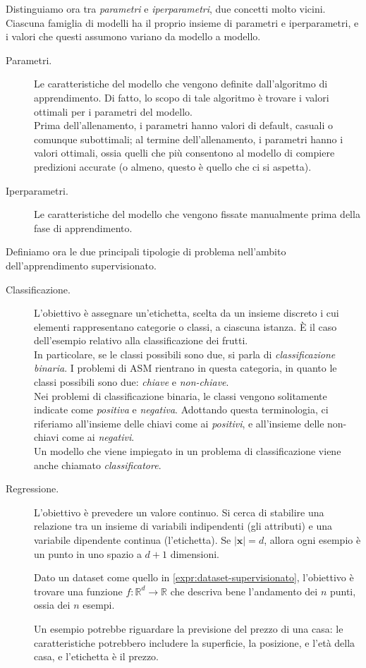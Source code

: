 \noindent Distinguiamo ora tra \textit{parametri} e \textit{iperparametri}, due concetti molto vicini. Ciascuna famiglia di modelli ha il proprio insieme di parametri e iperparametri, e i valori che questi assumono variano da modello a modello.
\begin{description}
    \item[Parametri.] Le caratteristiche del modello che vengono definite dall'algoritmo di apprendimento. Di fatto, lo scopo di tale algoritmo è trovare i valori ottimali per i parametri del modello. \\
    Prima dell'allenamento, i parametri hanno valori di default, casuali o comunque subottimali; al termine dell'allenamento, i parametri hanno i valori ottimali, ossia quelli che più consentono al modello di compiere predizioni accurate (o almeno, questo è quello che ci si aspetta).
    \item[Iperparametri.] Le caratteristiche del modello che vengono fissate manualmente prima della fase di apprendimento.
\end{description}

Definiamo ora le due principali tipologie di problema nell'ambito dell'apprendimento supervisionato.
\begin{description}
    \item[Classificazione.] L'obiettivo è assegnare un'etichetta, scelta da un insieme discreto i cui elementi rappresentano categorie o classi, a ciascuna istanza. È il caso dell'esempio relativo alla classificazione dei frutti. \\
    In particolare, se le classi possibili sono due, si parla di \textit{classificazione binaria}. I problemi di ASM rientrano in questa categoria, in quanto le classi possibili sono due: \textit{chiave} e \textit{non-chiave}. \\
    Nei problemi di classificazione binaria, le classi vengono solitamente indicate come \textit{positiva} e \textit{negativa}. Adottando questa terminologia, ci riferiamo all'insieme delle chiavi come ai \textit{positivi}, e all'insieme delle non-chiavi come ai \textit{negativi}. \\
    Un modello che viene impiegato in un problema di classificazione viene anche chiamato \textit{classificatore}.

    \item[Regressione.] L'obiettivo è prevedere un valore continuo. Si cerca di stabilire una relazione tra un insieme di variabili indipendenti (gli attributi) e una variabile dipendente continua (l'etichetta). Se $|\mathbf{x}|=d$, allora ogni esempio è un punto in uno spazio a $d+1$ dimensioni.

    Dato un dataset come quello in \eqref{expr:dataset-supervisionato}, l'obiettivo è trovare una funzione $f:\mathbb{R}^d \rightarrow \mathbb{R}$ che descriva bene l'andamento dei $n$ punti, ossia dei $n$ esempi.

    Un esempio potrebbe riguardare la previsione del prezzo di una casa: le caratteristiche potrebbero includere la superficie, la posizione, e l'età della casa, e l'etichetta è il prezzo.
\end{description}

